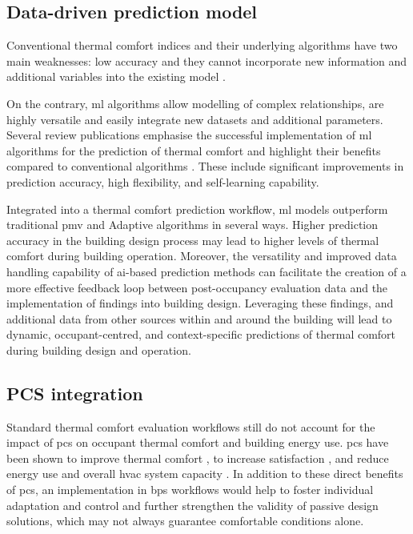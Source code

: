 
\subsection{Data-driven prediction model}

Conventional thermal comfort indices and their underlying algorithms have two main weaknesses: low accuracy \citep{Cheung2019, Luo2020, KimZhou2018} and they cannot incorporate new information and additional variables into the existing model \citep{VanHoof2008}.

On the contrary, \gls{ml} algorithms allow modelling of complex relationships, are highly versatile and easily integrate new datasets and additional parameters. Several review publications emphasise the successful implementation of \gls{ml} algorithms for the prediction of thermal comfort and highlight their benefits compared to conventional algorithms \citep{KimSchiavon2018, QavidelFard2022}. These include significant improvements in prediction accuracy, high flexibility, and self-learning capability. 

Integrated into a thermal comfort prediction workflow, \gls{ml} models outperform traditional \gls{pmv} and Adaptive algorithms in several ways. Higher prediction accuracy in the building design process may lead to higher levels of thermal comfort during building operation. Moreover, the versatility and improved data handling capability of \gls{ai}-based prediction methods can facilitate the creation of a more effective feedback loop between post-occupancy evaluation data and the implementation of findings into building design. Leveraging these findings, and additional data from other sources within and around the building will lead to dynamic, occupant-centred, and context-specific predictions of thermal comfort during building design and operation.



\subsection{PCS integration}

Standard thermal comfort evaluation workflows still do not account for the impact of \gls{pcs} on occupant thermal comfort and building energy use. \gls{pcs} have been shown to improve thermal comfort \citep{Zhang2022}, to increase satisfaction \citep{Kim2019, Zhang2022}, and reduce energy use and overall \gls{hvac} system capacity \citep{Zhang2018, Rawal2020, Knudsen2023}. In addition to these direct benefits of \gls{pcs}, an implementation in \gls{bps} workflows would help to foster individual adaptation and control and further strengthen the validity of passive design solutions, which may not always guarantee comfortable conditions alone.


